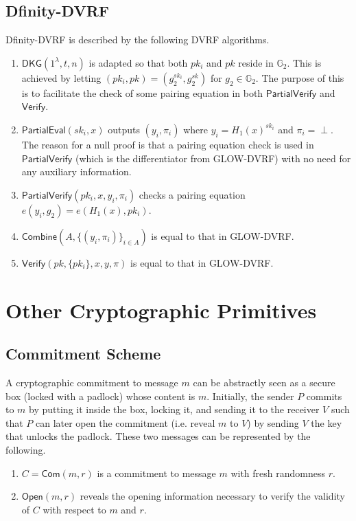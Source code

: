 \documentclass[letterpaper,twocolumn,10pt]{article}
\theoremstyle{definition}
\theoremstyle{remark}
\begin{document}
\subsection{Dfinity-DVRF}
\label{appendix:dfinity-dvrf}
Dfinity-DVRF is described by the following DVRF algorithms.
\begin{enumerate}
\item $\mathsf{DKG}(1^\lambda, t, n)$ is adapted so that both $pk_i$ and $pk$ reside in $\mathbb{G}_2$. This is achieved by letting $(pk_i, pk) = (g_2^{sk_i}, g_2^{sk})$ for $g_2 \in \mathbb{G}_2$. The purpose of this is to facilitate the check of some pairing equation in both $\mathsf{PartialVerify}$ and $\mathsf{Verify}$.
\item $\mathsf{PartialEval}(sk_i, x)$ outputs $(y_i, \pi_i)$ where $y_i = H_1(x)^{sk_i}$ and $\pi_i = \text{$\perp$}$. The reason for a null proof is that a pairing equation check is used in $\mathsf{PartialVerify}$ (which is the differentiator from GLOW-DVRF) with no need for any auxiliary information.
\item $\mathsf{PartialVerify}(pk_i, x, y_i, \pi_i)$ checks a pairing equation $e(y_i, g_2) = e(H_1(x), pk_i)$.
\item $\mathsf{Combine}(A, \{(y_i, \pi_i)\}_{i \in A})$ is equal to that in GLOW-DVRF.
\item $\mathsf{Verify}(pk, \{pk_i\}, x, y, \pi)$ is equal to that in GLOW-DVRF.
\end{enumerate}

\section{Other Cryptographic Primitives}
\subsection{Commitment Scheme}
\label{appendix:commitment}
A cryptographic commitment \cite{blum1983coin} to message $m$ can be abstractly seen as a secure box (locked with a padlock) whose content is $m$. Initially, the sender $P$ commits to $m$ by putting it inside the box, locking it, and sending it to the receiver $V$ such that $P$ can later open the commitment (i.e. reveal $m$ to $V$) by sending $V$ the key that unlocks the padlock. These two messages can be represented by the following.
\begin{enumerate}
\item $C = \mathsf{Com}(m, r)$ is a commitment to message $m$ with fresh randomness $r$.
\item $\mathsf{Open}(m, r)$ reveals the opening information necessary to verify the validity of $C$ with respect to $m$ and $r$.
\end{enumerate}
\end{document}
